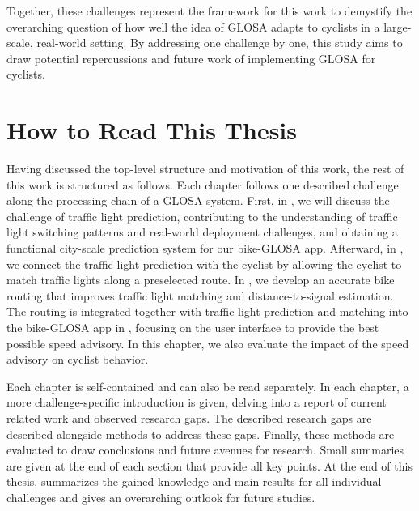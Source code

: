 Together, these challenges represent the framework for this work to demystify the overarching question of how well the idea of GLOSA adapts to cyclists in a large-scale, real-world setting. By addressing one challenge by one, this study aims to draw potential repercussions and future work of implementing GLOSA for cyclists.

\section{How to Read This Thesis}

Having discussed the top-level structure and motivation of this work, the rest of this work is structured as follows. Each chapter follows one described challenge along the processing chain of a GLOSA system. First, in , we will discuss the challenge of traffic light prediction, contributing to the understanding of traffic light switching patterns and real-world deployment challenges, and obtaining a functional city-scale prediction system for our bike-GLOSA app. Afterward, in , we connect the traffic light prediction with the cyclist by allowing the cyclist to match traffic lights along a preselected route. In , we develop an accurate bike routing that improves traffic light matching and distance-to-signal estimation. The routing is integrated together with traffic light prediction and matching into the bike-GLOSA app in , focusing on the user interface to provide the best possible speed advisory. In this chapter, we also evaluate the impact of the speed advisory on cyclist behavior. 

Each chapter is self-contained and can also be read separately. In each chapter, a more challenge-specific introduction is given, delving into a report of current related work and observed research gaps. The described research gaps are described alongside methods to address these gaps. Finally, these methods are evaluated to draw conclusions and future avenues for research. Small summaries are given at the end of each section that provide all key points. At the end of this thesis,  summarizes the gained knowledge and main results for all individual challenges and gives an overarching outlook for future studies. 
